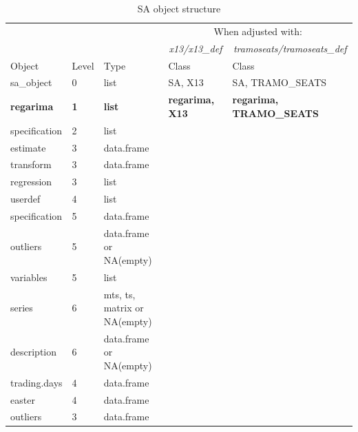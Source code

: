 \documentclass[article]{jss}
\begin{document}
\begin{longtable}[t]{lllll}
\caption{\label{tab:unnamed-chunk-4}SA object structure}\\
\toprule
\multicolumn{1}{c}{ } & \multicolumn{1}{c}{ } & \multicolumn{1}{c}{ } & \multicolumn{2}{c}{When adjusted with:} \\
\cmidrule(l{2pt}r{2pt}){4-5}
\multicolumn{1}{c}{\em  } & \multicolumn{1}{c}{\em  } & \multicolumn{1}{c}{\em  } & \multicolumn{1}{c}{\em x13/x13\_def} & \multicolumn{1}{c}{\em  tramoseats/tramoseats\_def} \\
\cmidrule(l{2pt}r{2pt}){4-4} \cmidrule(l{2pt}r{2pt}){5-5}
Object & Level & Type & Class & Class\\
\midrule
sa\_object & 0 & list & SA, X13 & SA, TRAMO\_SEATS\\
\textbf{\hspace{1em}regarima} & \textbf{1} & \textbf{list} & \textbf{regarima, X13} & \textbf{regarima, TRAMO\_SEATS}\\
\hspace{2em}specification & 2 & list &  & \\
\hspace{3em}estimate & 3 & data.frame &  & \\
\hspace{3em}transform & 3 & data.frame &  & \\
\addlinespace
\hspace{3em}regression & 3 & list &  & \\
\hspace{4em}userdef & 4 & list &  & \\
\hspace{5em}specification & 5 & data.frame &  & \\
\hspace{5em}outliers & 5 & data.frame or NA(empty) &  & \\
\hspace{5em}variables & 5 & list &  & \\
\addlinespace
\hspace{6em}series & 6 & mts, ts, matrix or NA(empty) &  & \\
\hspace{6em}description & 6 & data.frame or NA(empty) &  & \\
\hspace{4em}trading.days & 4 & data.frame &  & \\
\hspace{4em}easter & 4 & data.frame &  & \\
\hspace{3em}outliers & 3 & data.frame &  & \\

\end{longtable}
\end{document}
